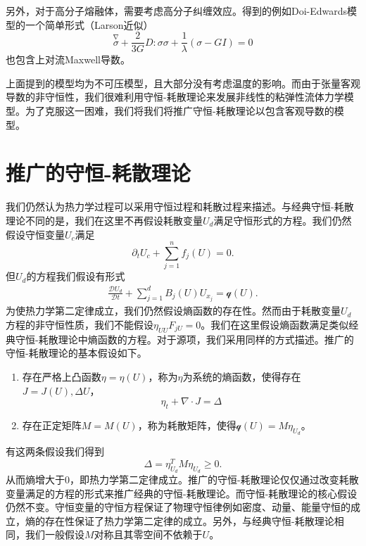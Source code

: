 \documentclass{article}
\begin{document}
另外，对于高分子熔融体，需要考虑高分子纠缠效应。得到的例如Doi-Edwards模型的一个简单形式（Larson近似）
\begin{equation}
	\stackrel{\nabla} \sigma + \frac{2}{3G} D:\sigma \sigma + \frac{1}{\lambda}(\sigma - G I) = 0
\end{equation}
也包含上对流Maxwell导数\cite{}。

上面提到的模型均为不可压模型，且大部分没有考虑温度的影响。而由于张量客观导数的非守恒性，我们很难利用守恒-耗散理论来发展非线性的粘弹性流体力学模型。为了克服这一困难，我们将我们将推广守恒-耗散理论以包含客观导数的模型。


\section{推广的守恒-耗散理论}
我们仍然认为热力学过程可以采用守恒过程和耗散过程来描述。与经典守恒-耗散理论不同的是，我们在这里不再假设耗散变量$U_d$满足守恒形式的方程。我们仍然假设守恒变量$U_c$满足
\begin{equation*}
	\partial_t U_c + \sum_{j=1}^n f_j(U) = 0.
\end{equation*}
但$U_d$的方程我们假设有形式
\begin{eqnarray*}
	\frac{\mathcal{D} U_d}{\mathcal{D} t} + \sum_{j=1}^d B_{j}(U)U_{x_j} = \mathcal{q}(U).
\end{eqnarray*}
为使热力学第二定律成立，我们仍然假设熵函数的存在性。然而由于耗散变量$U_d$方程的非守恒性质，我们不能假设$\eta_{UU}F_{jU} = 0$。我们在这里假设熵函数满足类似经典守恒-耗散理论中熵函数的方程。对于源项，我们采用同样的方式描述。推广的守恒-耗散理论的基本假设如下。
\begin{enumerate}
		\item 存在严格上凸函数$\eta = \eta (U)$，称为$\eta$为系统的熵函数，使得存在$J=J(U),\Delta{U}$，
		\begin{equation}
			\eta_t + \nabla \cdot J = \Delta
		\end{equation}
		\item 存在正定矩阵$M = M(U)$，称为耗散矩阵，使得$\mathcal{q}(U) = M \eta_{U_d}$。
	\end{enumerate}
	有这两条假设我们得到
	\begin{equation*}
		\Delta = \eta_{U_d}^T M \eta_{U_d} \ge 0.
	\end{equation*}
从而熵增大于0，即热力学第二定律成立。推广的守恒-耗散理论仅仅通过改变耗散变量满足的方程的形式来推广经典的守恒-耗散理论。而守恒-耗散理论的核心假设仍然不变。守恒变量的守恒方程保证了物理守恒律例如密度、动量、能量守恒的成立，熵的存在性保证了热力学第二定律的成立。另外，与经典守恒-耗散理论相同，我们一般假设$M$对称且其零空间不依赖于$U$。
\end{document}
